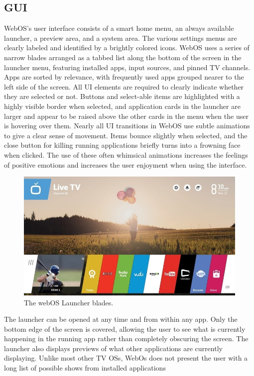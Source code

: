 \documentclass[12pt, letterpaper]{article}
\begin{document}
\subsection{GUI}
WebOS's user interface consists of a smart home menu, an always available launcher, a preview area, and a system area. The various settings menus are clearly labeled and identified by a brightly colored icons.  WebOS uses a series of narrow blades arranged as a tabbed list along the bottom of the screen in the launcher menu,
featuring installed apps, input sources, and pinned TV channels.  Apps are sorted by relevance, with frequently used apps grouped nearer to the left side of the screen.  All UI elements are required to clearly indicate whether they are selected or not.  Buttons and select-able items are highlighted with a highly visible border when selected, 
and application cards in the launcher are larger and appear to be raised above the other cards in the menu when the user is hovering over them.  Nearly all UI transitions in WebOS use subtle animations to give a clear sense of movement.  Items bounce slightly when selected, and the close button for killing running 
applications briefly turns into a frowning face when clicked.  The use of these often whimsical animations increases the feelings of positive emotions and increases the user enjoyment when using the interface.  
\begin{figure}[h]
    \includegraphics[width=\textwidth]{lg-webos.jpeg}
    \caption{The webOS Launcher blades.}
\end{figure}
\newpage
The launcher can be opened at any time and from within any app. Only the bottom edge of the screen is covered, 
allowing the user to see what is currently happening in the running app rather than completely obscuring the screen.  The launcher also displays previews of what other applications are currently displaying.  Unlike most other TV OSs, WebOs does not present the user with a long list of possible shows from installed applications 
\end{document}
